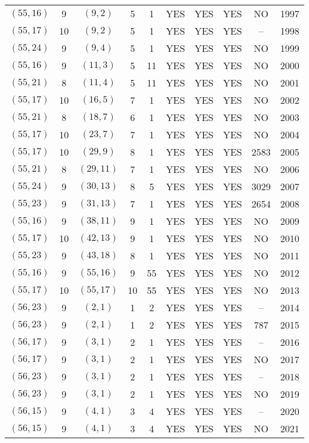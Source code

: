 \begin{longtable}{|c|c|c|c|c|c|c|c|c|c|}
$(55, 16)$ & 9 & $(9, 2)$ & 5 & 1 & YES & YES & YES & NO & 1997\\
$(55, 17)$ & 10 & $(9, 2)$ & 5 & 1 & YES & YES & YES & -- & 1998\\
$(55, 24)$ & 9 & $(9, 4)$ & 5 & 1 & YES & YES & YES & NO & 1999\\
$(55, 16)$ & 9 & $(11, 3)$ & 5 & 11 & YES & YES & YES & NO & 2000\\
$(55, 21)$ & 8 & $(11, 4)$ & 5 & 11 & YES & YES & YES & NO & 2001\\
$(55, 17)$ & 10 & $(16, 5)$ & 7 & 1 & YES & YES & YES & NO & 2002\\
$(55, 21)$ & 8 & $(18, 7)$ & 6 & 1 & YES & YES & YES & NO & 2003\\
$(55, 17)$ & 10 & $(23, 7)$ & 7 & 1 & YES & YES & YES & NO & 2004\\
$(55, 17)$ & 10 & $(29, 9)$ & 8 & 1 & YES & YES & YES & 2583 & 2005\\
$(55, 21)$ & 8 & $(29, 11)$ & 7 & 1 & YES & YES & YES & NO & 2006\\
$(55, 24)$ & 9 & $(30, 13)$ & 8 & 5 & YES & YES & YES & 3029 & 2007\\
$(55, 23)$ & 9 & $(31, 13)$ & 7 & 1 & YES & YES & YES & 2654 & 2008\\
$(55, 16)$ & 9 & $(38, 11)$ & 9 & 1 & YES & YES & YES & NO & 2009\\
$(55, 17)$ & 10 & $(42, 13)$ & 9 & 1 & YES & YES & YES & NO & 2010\\
$(55, 23)$ & 9 & $(43, 18)$ & 8 & 1 & YES & YES & YES & NO & 2011\\
$(55, 16)$ & 9 & $(55, 16)$ & 9 & 55 & YES & YES & YES & NO & 2012\\
$(55, 17)$ & 10 & $(55, 17)$ & 10 & 55 & YES & YES & YES & NO & 2013\\
$(56, 23)$ & 9 & $(2, 1)$ & 1 & 2 & YES & YES & YES & -- & 2014\\
$(56, 23)$ & 9 & $(2, 1)$ & 1 & 2 & YES & YES & YES & 787 & 2015\\
$(56, 17)$ & 9 & $(3, 1)$ & 2 & 1 & YES & YES & YES & -- & 2016\\
$(56, 17)$ & 9 & $(3, 1)$ & 2 & 1 & YES & YES & YES & NO & 2017\\
$(56, 23)$ & 9 & $(3, 1)$ & 2 & 1 & YES & YES & YES & -- & 2018\\
$(56, 23)$ & 9 & $(3, 1)$ & 2 & 1 & YES & YES & YES & NO & 2019\\
$(56, 15)$ & 9 & $(4, 1)$ & 3 & 4 & YES & YES & YES & -- & 2020\\
$(56, 15)$ & 9 & $(4, 1)$ & 3 & 4 & YES & YES & YES & NO & 2021\\

\end{longtable}
